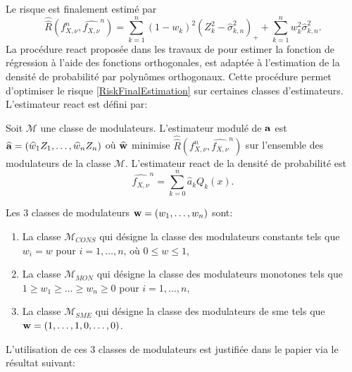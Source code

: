 Le risque est finalement estimé par 
\begin{equation}\label{RiskFinalEstimation}
\widehat{\widehat{R}}\left(f_{X,\nu}^{n},\widehat{f_{X,\nu}}^{n} \right)=\sum_{k=1}^{n}(1-w_{k})^{2}\left(Z_{k}^{2}-\widehat{\sigma}_{k,n}^{2}\right)_{+}+\sum_{k=1}^{n}w_{k}^{2}\widehat{\sigma}_{k,n}^{2}.
\end{equation}
La procédure \gls{react} proposée dans les travaux de \citet{Be00} pour estimer la fonction de régression à l'aide des fonctions orthogonales, est adaptée à l'estimation de la densité de probabilité par polynômes orthogonaux. Cette procédure permet d\rq{}optimiser le risque \eqref{RiskFinalEstimation} sur certaines classes d\rq{}estimateurs.  L'estimateur \gls{react} est défini par:
\begin{Def}
Soit $\mathcal{M}$ une classe de modulateurs. L'estimateur modulé de $\bold{a}$ est $\widehat{\bold{a}}=(\widehat{w}_{1}Z_{1},\ldots,\widehat{w}_{n}Z_{n})$ où $\widehat{\bold{w}}$ minimise $\widehat{\widehat{R}}\left(f_{X,\nu}^{n},\widehat{f_{X,\nu}}^{n} \right)$ sur l'ensemble des modulateurs de la classe $\mathcal{M}$. L'estimateur \gls{react} de la densité de probabilité est 
\begin{equation*}
\widehat{f_{X,\nu}}^{n}=\sum_{k=0}^{n}\widehat{a}_{k}Q_{k}(x).
\end{equation*}
\end{Def}
\begin{Def}\label{ModulatorDefinition}
Les $3$ classes de modulateurs $\bold{w}=(w_{1},\ldots,w_{n})$ sont:
\begin{enumerate}
\item La classe $\mathcal{M}_{CONS}$ qui désigne la classe des modulateurs constants tels que $w_{i}=w$ pour $i=1,\ldots,n$, où $0\leq w\leq1$,
\item La classe $\mathcal{M}_{MON}$ qui désigne la classe des modulateurs monotones tels que $1\geq w_{1}\geq\ldots\geq w_{n}\geq 0$ pour $i=1,\ldots,n$, 
\item La classe $\mathcal{M}_{SME}$ qui désigne la classe des modulateurs de \gls{sme} tels que $\bold{w}=(1,\ldots,1,0,\ldots,0)$.
\end{enumerate}
\end{Def}
L'utilisation de ces $3$ classes de modulateurs est justifiée dans le papier \citet{BeDu98} via le résultat suivant:
